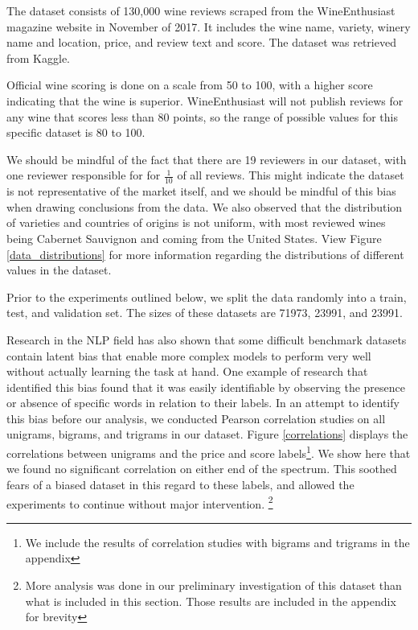 \documentclass[12pt]{IEEEtran}
\begin{document}
    The dataset consists of 130,000 wine reviews scraped from the WineEnthusiast magazine website in November of 2017. It includes the wine name, variety, winery name and location, price, and review text and score. The dataset was retrieved from Kaggle\cite{data}. \par
    Official wine scoring is done on a scale from 50 to 100, with a higher score indicating that the wine is superior\cite{wine_scoring}. WineEnthusiast will not publish reviews for any wine that scores less than 80 points, so the range of possible values for this specific dataset is 80 to 100. \par
    We should be mindful of the fact that there are 19 reviewers in our dataset, with one reviewer responsible for for $\frac{1}{10}$ of all reviews. This might indicate the dataset is not representative of the market itself, and we should be mindful of this bias when drawing conclusions from the data.
    We also observed that the distribution of varieties and countries of origins is not uniform, with most reviewed wines being Cabernet Sauvignon and coming from the United States. View Figure \ref{data_distributions} for more information regarding the distributions of different values in the dataset. \par
    Prior to the experiments outlined below, we split the data randomly into a train, test, and validation set. The sizes of these datasets are 71973, 23991, and 23991. \par
    Research in the NLP field has also shown that some difficult benchmark datasets contain latent bias that enable more complex models to perform very well without actually learning the task at hand. One example of research that identified this bias found that it was easily identifiable by observing the presence or absence of specific words in relation to their labels\cite{clever_hans}. In an attempt to identify this bias before our analysis, we conducted Pearson correlation studies on all unigrams, bigrams, and trigrams in our dataset. Figure \ref{correlations} displays the correlations between unigrams and the price and score labels\footnote{We include the results of correlation studies with bigrams and trigrams in the appendix}. We show here that we found no significant correlation on either end of the spectrum. This soothed fears of a biased dataset in this regard to these labels, and allowed the experiments to continue without major intervention.
    \footnote{More analysis was done in our preliminary investigation of this dataset than what is included in this section. Those results are included in the appendix for brevity} \par
\end{document}
